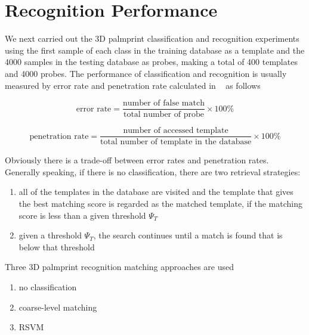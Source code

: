 \section{Recognition Performance}
\label{sec:experiment:recognition}

We next carried out the 3D palmprint classification and recognition experiments using the first sample of each class in the training database as a template and the 4000 samples in the testing database as probes, making a total of 400 templates and 4000 probes. The performance of classification and recognition is usually measured by error rate and penetration rate calculated in ~\cite{[19]} as follows

\begin{equation}
\text{error rate} = \frac{\text{number of false match}}{\text{total number of probe}} \times 100\%
\end{equation}

\begin{equation}
\text{penetration rate} = \frac{\text{number of accessed template}}{\text{total number of template in the database}} \times 100\%
\label{eq:experiment:prate}
\end{equation}

Obviously there is a trade-off between error rates and penetration rates. Generally speaking, if there is no classification, there are two retrieval strategies:

\begin{enumerate}
    \item all of the templates in the database are visited and the template that gives the best matching score is regarded as the matched template, if the matching score is less than a given threshold $\Psi_T$
    \item given a threshold $\Psi_T$, the search continues until a match is found that is below that threshold
\end{enumerate}

Three 3D palmprint recognition matching approaches are used

\begin{enumerate}
    \item no classification
    \item coarse-level matching
    \item RSVM
\end{enumerate}

